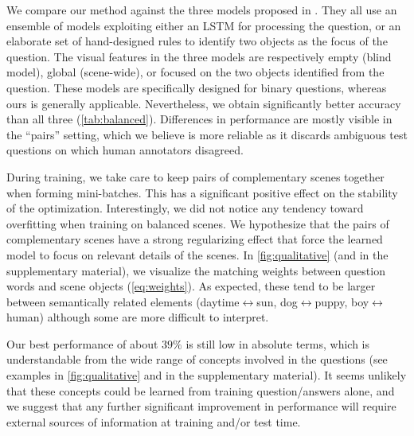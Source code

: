 We compare our method against the three models proposed in \cite{zhang2015balanced}. They all use an ensemble of models exploiting either an LSTM for processing the question, or an elaborate set of hand-designed rules to identify two objects as the focus of the question. The visual features in the three models are respectively empty (blind model), global (scene-wide), or focused on the two objects identified from the question. These models are specifically designed for binary questions, whereas ours is generally applicable. Nevertheless, we obtain significantly better accuracy than all three (\tab\ref{tab:balanced}). Differences in performance are mostly visible in the ``pairs'' setting, which we believe is more reliable as it discards ambiguous test questions on which human annotators disagreed.

During training, we take care to keep pairs of complementary scenes together when forming mini-batches. This has a significant positive effect on the stability of the optimization. Interestingly, we did not notice any tendency toward overfitting when training on balanced scenes. We hypothesize that the pairs of complementary scenes have a strong regularizing effect that force the learned model to focus on relevant details of the scenes. In \fig\ref{fig:qualitative} (and in the supplementary material), we visualize the matching weights between question words and scene objects (\eq\ref{eq:weights}). As expected, these tend to be larger between semantically related elements (\eg daytime$\leftrightarrow$sun, dog$\leftrightarrow$puppy, boy$\leftrightarrow$human) although some are more difficult to interpret.

Our best performance of about $39\%$ is still low in absolute terms, which is understandable from the wide range of concepts involved in the questions (see examples in \fig\ref{fig:qualitative} and in the supplementary material). It seems unlikely that these concepts could be learned from training question/answers alone, and we suggest that any further significant improvement in performance will require external sources of information at training and/or test time.

